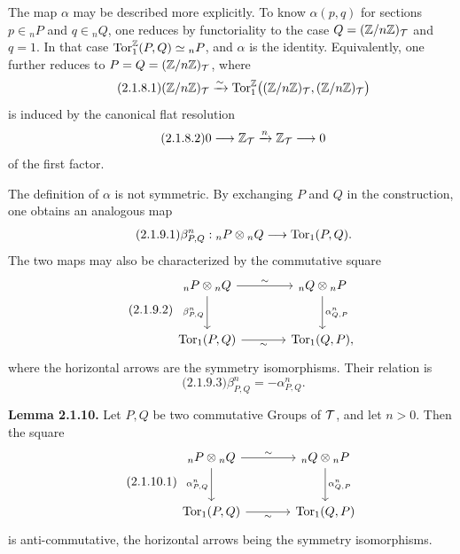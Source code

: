\documentclass[11pt]{article}
\begin{document}
The map \(\alpha\) may be described more explicitly.  To know \(\alpha(p,q)\) for sections \(p\in{}_nP\) and \(q\in{}_nQ\), one reduces by functoriality to the case \(Q=(\mathbb Z/n\mathbb Z)_\mathcal T\) and \(q=1\).  In that case \(\operatorname{Tor}_1^{\mathbb Z}(P,Q)\simeq{}_nP\), and \(\alpha\) is the identity.  Equivalently, one further reduces to \(P=Q=(\mathbb Z/n\mathbb Z)_\mathcal T\), where
\begin{equation}\qquad\text{(2.1.8.1)}
        (\mathbb Z/n\mathbb Z)_\mathcal T
        \xrightarrow{\sim}\operatorname{Tor}_1^{\mathbb Z}\bigl((\mathbb Z/n\mathbb Z)_\mathcal T,(\mathbb Z/n\mathbb Z)_\mathcal T\bigr)
\end{equation}
is induced by the canonical flat resolution
\begin{equation}\qquad\text{(2.1.8.2)}
        0\longrightarrow\mathbb Z_\mathcal T\xrightarrow{n}\mathbb Z_\mathcal T\longrightarrow0
\end{equation}
of the first factor.

The definition of \(\alpha\) is not symmetric.  By exchanging \(P\) and \(Q\) in the construction, one obtains an analogous map
\begin{equation}\qquad\text{(2.1.9.1)}
        \beta^n_{P,Q}:{}_nP\otimes{}_nQ\longrightarrow\operatorname{Tor}_1(P,Q).
\end{equation}
The two maps may also be characterized by the commutative square
\begin{equation}\qquad\text{(2.1.9.2)}
\begin{tikzcd}[column sep=large,row sep=large]
{}_nP\otimes{}_nQ \arrow[r,"\sim"] \arrow[d,"\beta^n_{P,Q}"']
  & {}_nQ\otimes{}_nP \arrow[d,"\alpha^n_{Q,P}"]\\
\Torop_1(P,Q) \arrow[r,"\sim"'] & \Torop_1(Q,P),
\end{tikzcd}
\end{equation}
where the horizontal arrows are the symmetry isomorphisms.  Their relation is
\begin{equation}\qquad\text{(2.1.9.3)}
        \beta^n_{P,Q}=-\alpha^n_{P,Q}.
\end{equation}

\textbf{Lemma 2.1.10.}  Let \(P,Q\) be two commutative Groups of \(\mathcal T\), and let \(n>0\).  Then the square
\begin{equation}\qquad\text{(2.1.10.1)}
\begin{tikzcd}[column sep=large,row sep=large]
{}_nP\otimes{}_nQ \arrow[r,"\sim"] \arrow[d,"\alpha^n_{P,Q}"']
  & {}_nQ\otimes{}_nP \arrow[d,"\alpha^n_{Q,P}"]\\
\Torop_1(P,Q) \arrow[r,"\sim"'] & \Torop_1(Q,P)
\end{tikzcd}
\end{equation}
is anti-commutative, the horizontal arrows being the symmetry isomorphisms.
\end{document}
